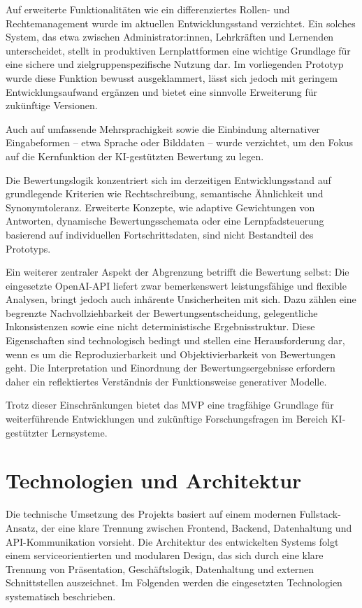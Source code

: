 \documentclass[a4paper,12pt]{article}
\begin{document}
Auf erweiterte Funktionalitäten wie ein differenziertes Rollen- und Rechtemanagement wurde im aktuellen Entwicklungsstand verzichtet. Ein solches System, das etwa zwischen Administrator:innen, Lehrkräften und Lernenden unterscheidet, stellt in produktiven Lernplattformen eine wichtige Grundlage für eine sichere und zielgruppenspezifische Nutzung dar. Im vorliegenden Prototyp wurde diese Funktion bewusst ausgeklammert, lässt sich jedoch mit geringem Entwicklungsaufwand ergänzen und bietet eine sinnvolle Erweiterung für zukünftige Versionen.

Auch auf umfassende Mehrsprachigkeit sowie die Einbindung alternativer Eingabeformen – etwa Sprache oder Bilddaten – wurde verzichtet, um den Fokus auf die Kernfunktion der KI-gestützten Bewertung zu legen.

Die Bewertungslogik konzentriert sich im derzeitigen Entwicklungsstand auf grundlegende Kriterien wie Rechtschreibung, semantische Ähnlichkeit und Synonymtoleranz. Erweiterte Konzepte, wie adaptive Gewichtungen von Antworten, dynamische Bewertungsschemata oder eine Lernpfadsteuerung basierend auf individuellen Fortschrittsdaten, sind nicht Bestandteil des Prototyps.

Ein weiterer zentraler Aspekt der Abgrenzung betrifft die Bewertung selbst: Die eingesetzte OpenAI-API liefert zwar bemerkenswert leistungsfähige und flexible Analysen, bringt jedoch auch inhärente Unsicherheiten mit sich. Dazu zählen eine begrenzte Nachvollziehbarkeit der Bewertungsentscheidung, gelegentliche Inkonsistenzen sowie eine nicht deterministische Ergebnisstruktur. Diese Eigenschaften sind technologisch bedingt und stellen eine Herausforderung dar, wenn es um die Reproduzierbarkeit und Objektivierbarkeit von Bewertungen geht. Die Interpretation und Einordnung der Bewertungsergebnisse erfordern daher ein reflektiertes Verständnis der Funktionsweise generativer Modelle.

Trotz dieser Einschränkungen bietet das MVP eine tragfähige Grundlage für weiterführende Entwicklungen und zukünftige Forschungsfragen im Bereich KI-gestützter Lernsysteme.

\newpage


\section{Technologien und Architektur}
Die technische Umsetzung des Projekts basiert auf einem modernen Fullstack-Ansatz, der eine klare Trennung zwischen Frontend, Backend, Datenhaltung und API-Kommunikation vorsieht. Die Architektur des entwickelten Systems folgt einem serviceorientierten und modularen Design, das sich durch eine klare Trennung von Präsentation, Geschäftslogik, Datenhaltung und externen Schnittstellen auszeichnet. Im Folgenden werden die eingesetzten Technologien systematisch beschrieben.
\end{document}
